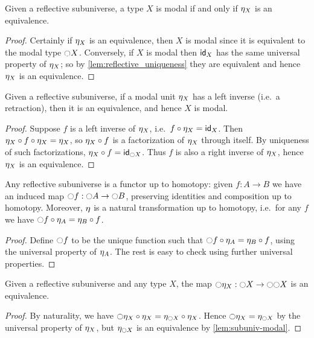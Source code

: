 \begin{lem}\label{lem:subuniv-modal}
  Given a reflective subuniverse, a type $X$ is modal if and only if $\modalunit[X]$ is an equivalence.
\end{lem}
\begin{proof}
  Certainly if $\modalunit[X]$ is an equivalence, then $X$ is modal since it is equivalent to the modal type $\modal X$.
  Conversely, if $X$ is modal then $\idfunc[X]$ has the same universal property of $\modalunit[X]$; so by \cref{lem:reflective_uniqueness} they are equivalent and hence $\modalunit[X]$ is an equivalence.
\end{proof}

\begin{lem}\label{thm:modalunit-retract-equiv}
  Given a reflective subuniverse, if a modal unit $\modalunit[X]$ has a left inverse (i.e.\ a retraction), then it is an equivalence, and hence $X$ is modal.
\end{lem}
\begin{proof}
  Suppose $f$ is a left inverse of $\modalunit[X]$, i.e.\ $f\circ \modalunit[X] = \idfunc[X]$.
  Then $\modalunit[X]\circ f\circ \modalunit[X] = \modalunit[X]$, so $\modalunit[X]\circ f$ is a factorization of $\modalunit[X]$ through itself.
  By uniqueness of such factorizations, $\modalunit[X]\circ f = \idfunc[\modal X]$.
  Thus $f$ is also a right inverse of $\modalunit[X]$, hence $\modalunit[X]$ is an equivalence.
\end{proof}

\begin{lem}
  Any reflective subuniverse is a functor up to homotopy: given $f:A\to B$ we have an induced map $\modal f : \modal A \to \modal B$, preserving identities and composition up to homotopy.
  Moreover, $\modalunit$ is a natural transformation up to homotopy, i.e.\ for any $f$ we have $\modal f \circ \modalunit[A] = \modalunit[B] \circ f$.
\end{lem}
\begin{proof}
  Define $\modal f$ to be the unique function such that $\modal f \circ \modalunit[A] = \modalunit[B] \circ f$, using the universal property of $\modalunit[A]$.
  The rest is easy to check using further universal properties.
\end{proof}

\begin{lem}
  Given a reflective subuniverse and any type $X$, the map $\modal \modalunit[X] : \modal X \to \modal\modal X$ is an equivalence.
\end{lem}
\begin{proof}
  By naturality, we have $\modal \modalunit[X] \circ \modalunit[X] = \modalunit[\modal X] \circ \modalunit[X]$.
  Hence $\modal \modalunit[X] = \modalunit[\modal X]$ by the universal property of $\modalunit[X]$, but $\modalunit[\modal X]$ is an equivalence by \cref{lem:subuniv-modal}.
\end{proof}

